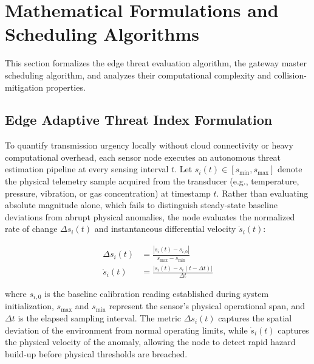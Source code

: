 \documentclass[preprint,review,12pt]{elsarticle}
\begin{document}



\section{Mathematical Formulations and Scheduling Algorithms}

\label{sec:algorithms}

This section formalizes the edge threat evaluation algorithm, the gateway master scheduling algorithm, and analyzes their computational complexity and collision-mitigation properties.

\subsection{Edge Adaptive Threat Index Formulation}

To quantify transmission urgency locally without cloud connectivity or heavy computational overhead, each sensor node executes an autonomous threat estimation pipeline at every sensing interval $t$. Let $s_i(t) \in [s_{\text{min}}, s_{\text{max}}]$ denote the physical telemetry sample acquired from the transducer (e.g., temperature, pressure, vibration, or gas concentration) at timestamp $t$. Rather than evaluating absolute magnitude alone, which fails to distinguish steady-state baseline deviations from abrupt physical anomalies, the node evaluates the normalized rate of change $\Delta s_i(t)$ and instantaneous differential velocity $\dot{s}_i(t)$:

\begin{align}

\Delta s_i(t) &= \frac{|s_i(t) - s_{i, 0}|}{s_{\text{max}} - s_{\text{min}}} \label{eq:delta_s} \\

\dot{s}_i(t) &= \frac{|s_i(t) - s_i(t - \Delta t)|}{\Delta t} \label{eq:s_dot}

\end{align}

where $s_{i, 0}$ is the baseline calibration reading established during system initialization, $s_{\text{max}}$ and $s_{\text{min}}$ represent the sensor's physical operational span, and $\Delta t$ is the elapsed sampling interval. The metric $\Delta s_i(t)$ captures the spatial deviation of the environment from normal operating limits, while $\dot{s}_i(t)$ captures the physical velocity of the anomaly, allowing the node to detect rapid hazard build-up before physical thresholds are breached.
\end{document}
